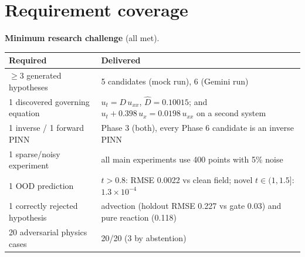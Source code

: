 \documentclass[11pt,a4paper]{article}
\begin{document}
\section{Requirement coverage}

\textbf{Minimum research challenge} (all met).
\begin{center}
\small
\begin{tabular}{@{}L{4.6cm}L{10.6cm}@{}}
\toprule
\textbf{Required} & \textbf{Delivered} \\ \midrule
$\ge$3 generated hypotheses & 5 candidates (mock run), 6 (Gemini run) \\
1 discovered governing equation & $u_t = D\,u_{xx}$, $\hat D = 0.10015$; and $u_t + 0.398\,u_x = 0.0198\,u_{xx}$ on a second system \\
1 inverse / 1 forward PINN & Phase 3 (both), every Phase 6 candidate is an inverse PINN \\
1 sparse/noisy experiment & all main experiments use 400 points with 5\% noise \\
1 OOD prediction & $t>0.8$: RMSE 0.0022 vs clean field; novel $t\in(1,1.5]$: $1.3\times10^{-4}$ \\
1 correctly rejected hypothesis & advection (holdout RMSE 0.227 vs gate 0.03) and pure reaction (0.118) \\
20 adversarial physics cases & 20/20 (3 by abstention) \\
\bottomrule
\end{tabular}
\end{center}
\end{document}
